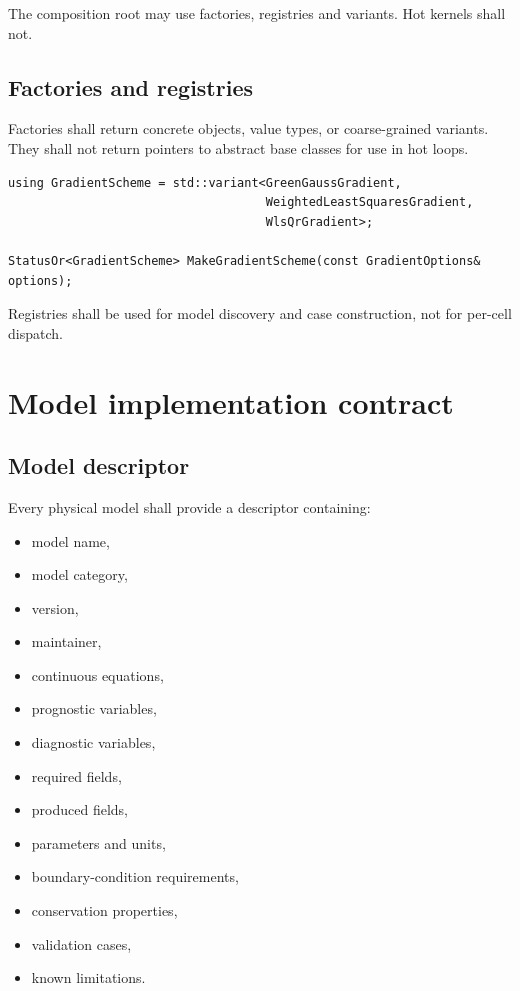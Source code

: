 \documentclass[11pt,a4paper]{article}
\newcommand{\Code}[1]{\texttt{\detokenize{#1}}}
\begin{document}
The composition root may use factories, registries and variants. Hot kernels shall not.

\subsection{Factories and registries}

Factories shall return concrete objects, value types, \Code{StatusOr<T>} or coarse-grained variants. They shall not return pointers to abstract base classes for use in hot loops.

\begin{lstlisting}
using GradientScheme = std::variant<GreenGaussGradient,
                                    WeightedLeastSquaresGradient,
                                    WlsQrGradient>;

StatusOr<GradientScheme> MakeGradientScheme(const GradientOptions& options);
\end{lstlisting}

Registries shall be used for model discovery and case construction, not for per-cell dispatch.

\section{Model implementation contract}

\subsection{Model descriptor}

Every physical model shall provide a descriptor containing:

\begin{itemize}
  \item model name,
  \item model category,
  \item version,
  \item maintainer,
  \item continuous equations,
  \item prognostic variables,
  \item diagnostic variables,
  \item required fields,
  \item produced fields,
  \item parameters and units,
  \item boundary-condition requirements,
  \item conservation properties,
  \item validation cases,
  \item known limitations.
\end{itemize}
\end{document}
